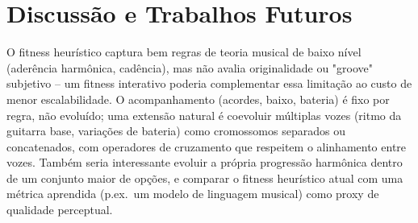 \documentclass{article}
\begin{document}
\section{Discussão e Trabalhos Futuros}\label{sec:discussion}

O fitness heurístico captura bem regras de teoria musical de baixo nível
(aderência harmônica, cadência), mas não avalia originalidade ou
"groove" subjetivo -- um fitness interativo \cite{Biles1994GenJam} poderia
complementar essa limitação ao custo de menor escalabilidade. O
acompanhamento (acordes, baixo, bateria) é fixo por regra, não evoluído;
uma extensão natural é coevoluir múltiplas vozes (ritmo da guitarra base,
variações de bateria) como cromossomos separados ou concatenados, com
operadores de cruzamento que respeitem o alinhamento entre vozes. Também
seria interessante evoluir a própria progressão harmônica dentro de um
conjunto maior de opções, e comparar o fitness heurístico atual com uma
métrica aprendida (p.ex.\ um modelo de linguagem musical) como proxy de
qualidade perceptual.


\end{document}
